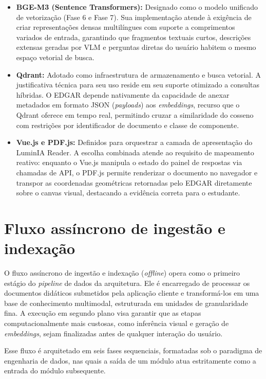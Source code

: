 \begin{itemize}
    \item \textbf{BGE-M3 (Sentence Transformers):} Designado como o modelo unificado de vetorização (Fase 6 e Fase 7). Sua implementação atende à exigência de criar representações densas multilíngues com suporte a comprimentos variados de entrada, garantindo que fragmentos textuais curtos, descrições extensas geradas por VLM e perguntas diretas do usuário habitem o mesmo espaço vetorial de busca.

    \item \textbf{Qdrant:} Adotado como infraestrutura de armazenamento e busca vetorial. A justificativa técnica para seu uso reside em seu suporte otimizado a consultas híbridas. O EDGAR depende nativamente da capacidade de anexar metadados em formato JSON (\textit{payloads}) aos \textit{embeddings}, recurso que o Qdrant oferece em tempo real, permitindo cruzar a similaridade do cosseno com restrições por identificador de documento e classe de componente.

   \item \textbf{Vue.js e PDF.js:} Definidos para orquestrar a camada de apresentação do LuminIA Reader. A escolha combinada atende ao requisito de mapeamento reativo: enquanto o Vue.js manipula o estado do painel de respostas via chamadas de API, o PDF.js permite renderizar o documento no navegador e transpor as coordenadas geométricas retornadas pelo EDGAR diretamente sobre o canvas visual, destacando a evidência correta para o estudante.

\end{itemize}

\section{Fluxo assíncrono de ingestão e indexação}
\label{sec:fluxo_assincrono_ingestao_indexacao}

O fluxo assíncrono de ingestão e indexação (\textit{offline}) opera como o primeiro estágio do \textit{pipeline} de dados da arquitetura. Ele é encarregado de processar os documentos didáticos submetidos pela aplicação cliente e transformá-los em uma base de conhecimento multimodal, estruturada em unidades de granularidade fina. A execução em segundo plano visa garantir que as etapas computacionalmente mais custosas, como inferência visual e geração de \textit{embeddings}, sejam finalizadas antes de qualquer interação do usuário.

Esse fluxo é arquitetado em seis fases sequenciais, formatadas sob o paradigma de engenharia de dados, nas quais a saída de um módulo atua estritamente como a entrada do módulo subsequente.

